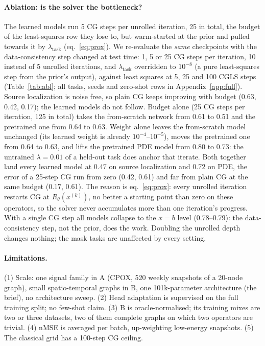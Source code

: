 \documentclass{article}
\begin{document}
\paragraph{Ablation: is the solver the bottleneck?}
The learned models run 5 CG steps per unrolled iteration, 25 in total, the budget of the least-squares row they
lose to, but warm-started at the prior and pulled towards it by $\lambda_{\text{task}}$ (eq.~\ref{eq:prox}).
We re-evaluate the \emph{same} checkpoints with the data-consistency step changed at test time: 1, 5 or 25 CG
steps per iteration, 10 instead of 5 unrolled iterations, and $\lambda_{\text{task}}$ overridden to $10^{-8}$
(a pure least-squares step from the prior's output), against least squares at 5, 25 and 100 CGLS steps
(Table~\ref{tab:abl}; all tasks, seeds and zero-shot rows in Appendix~\ref{app:full}). Source localization is
noise free, so plain CG keeps improving with budget (0.63, 0.42, 0.17); the learned models do not follow.
Budget alone (25 CG steps per iteration, 125 in total) takes the from-scratch network from 0.61 to 0.51 and
the pretrained one from 0.64 to 0.63. Weight alone leaves the from-scratch model unchanged (its learned weight
is already $10^{-4}$--$10^{-5}$), moves the pretrained one from 0.64 to 0.63, and lifts the pretrained PDE
model from 0.80 to 0.73: the untrained $\lambda = 0.01$ of a held-out task does anchor that iterate. Both
together land every learned model at 0.47 on source localization and 0.72 on PDE, the error of a 25-step CG
run from zero (0.42, 0.61) and far from plain CG at the same budget (0.17, 0.61). The reason is
eq.~\ref{eq:prox}: every unrolled iteration restarts CG at $R_\theta(x^{(k)})$, no better a starting point
than zero on these operators, so the solver never accumulates more than one iteration's progress. With a
single CG step all models collapse to the $x = b$ level (0.78--0.79): the data-consistency step, not the
prior, does the work. Doubling the unrolled depth changes nothing; the mask tasks are unaffected by every setting.

\begin{table}[t]
\centering\footnotesize

\caption{Test-time solver ablation: the checkpoints of Table~\ref{tab:a} re-run with a different data-consistency
step, no retraining (held-out-task cells, mean of 3 seeds; zero-shot and 10-iteration rows, all tasks and stds in
Table~\ref{tab:abl_full}).}
\label{tab:abl}
\end{table}

\paragraph{Limitations.} (1) Scale: one signal family in A (CPOX, 520 weekly snapshots of a 20-node graph),
small spatio-temporal graphs in B, one 101k-parameter architecture (the brief), no architecture sweep. (2) Head
adaptation is supervised on the full training split; no few-shot claim. (3) B is oracle-normalised; its training
mixes are two or three datasets, two of them complete graphs on which two operators are trivial. (4) nMSE is
averaged per batch, up-weighting low-energy snapshots. (5) The classical grid has a 100-step CG ceiling.
\end{document}
